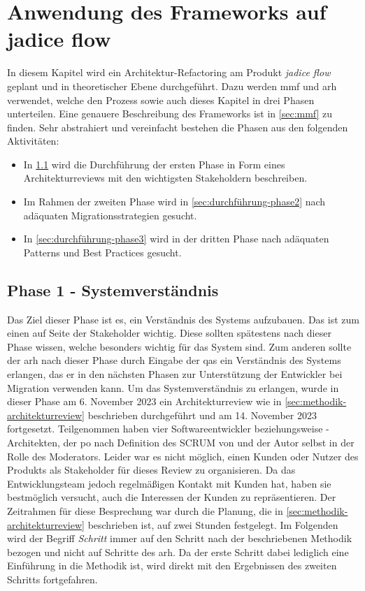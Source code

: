 \chapter{Anwendung des Frameworks auf jadice flow}
\label{chap:anwendung}

In diesem Kapitel wird ein Architektur-Refactoring am Produkt \emph{jadice flow} geplant und in theoretischer Ebene durchgeführt.
Dazu werden \acrfull{mmf} und \acrfull{arh} verwendet, welche den Prozess sowie auch dieses Kapitel in drei Phasen unterteilen.
Eine genauere Beschreibung des Frameworks ist in \cref{sec:mmf} zu finden.
Sehr abstrahiert und vereinfacht bestehen die Phasen aus den folgenden Aktivitäten:
\begin{itemize}
	\item In \cref{sec:durchführung-phase1} wird die Durchführung der ersten Phase in Form eines Architekturreviews mit den wichtigsten Stakeholdern beschreiben.
	\item Im Rahmen der zweiten Phase wird in \cref{sec:durchführung-phase2} nach adäquaten Migrationsstrategien gesucht.
	\item In \cref{sec:durchführung-phase3} wird in der dritten Phase nach adäquaten Patterns und Best Practices gesucht.
\end{itemize}

\section{Phase 1 - Systemverständnis}
\label{sec:durchführung-phase1}

Das Ziel dieser Phase ist es, ein Verständnis des Systems aufzubauen.
Das ist zum einen auf Seite der Stakeholder wichtig.
Diese sollten spätestens nach dieser Phase wissen, welche  besonders wichtig für das System sind.
Zum anderen sollte der \gls{arh} nach dieser Phase durch Eingabe der \glspl{qa} ein Verständnis des Systems erlangen, das er in den nächsten Phasen zur Unterstützung der Entwickler bei Migration verwenden kann.
Um das Systemverständnis zu erlangen, wurde in dieser Phase am 6. November 2023 ein Architekturreview wie in \cref{sec:methodik-architekturreview} beschrieben durchgeführt und am 14. November 2023 fortgesetzt.
Teilgenommen haben vier Softwareentwickler beziehungsweise -Architekten, der \acrlong{po} nach Definition des SCRUM von  und der Autor selbst in der Rolle des Moderators.
Leider war es nicht möglich, einen Kunden oder Nutzer des Produkts als Stakeholder für dieses Review zu organisieren.
Da das Entwicklungsteam jedoch regelmäßigen Kontakt mit Kunden hat, haben sie bestmöglich versucht, auch die Interessen der Kunden zu repräsentieren.
Der Zeitrahmen für diese Besprechung war durch die Planung, die in \cref{sec:methodik-architekturreview} beschrieben ist, auf zwei Stunden festgelegt.
Im Folgenden wird der Begriff \emph{Schritt} immer auf den Schritt nach der beschriebenen Methodik bezogen und nicht auf Schritte des \gls{arh}.
Da der erste Schritt dabei lediglich eine Einführung in die Methodik ist, wird direkt mit den Ergebnissen des zweiten Schritts fortgefahren.

